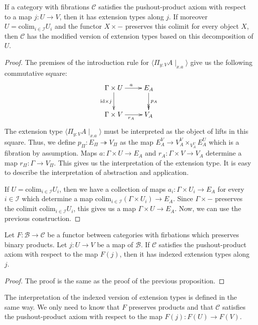 \documentclass[reqno]{amsart}
\theoremstyle{definition}
\theoremstyle{remark}
\newcommand{\fs}[1]{\mathrm{#1}}
\newcommand{\scat}[1]{\mathcal{#1}}
\newcommand{\id}{\fs{id}}
\numberwithin{figure}{section}
\begin{document}
\begin{prop}
If a category with fibrations $\scat{C}$ satisfies the pushout-product axiom with respect to a map $j : U \to V$, then it has extension types along $j$.
If moreover $U = \fs{colim}_{i \in \scat{I}} U_i$ and the functor $X \times -$ preserves this colimit for every object $X$, then $\scat{C}$ has the modified version of extension types based on this decomposition of $U$.
\end{prop}
\begin{proof}
The premises of the introduction rule for $\langle \Pi_{y : V} A \mid_{x.a} \rangle$ give us the following commutative square:
\[ \xymatrix{ \Gamma \times U \ar[r]^a \ar[d]_{\id \times j}    & E_A \ar@{->>}[d]^{p_A} \\
              \Gamma \times V \ar[r]_{r_A}                      & V_A
            } \]
The extension type $\langle \Pi_{y : V} A \mid_{x.a} \rangle$ must be interpreted as the object of lifts in this square.
Thus, we define $p_\Pi : E_\Pi \twoheadrightarrow V_\Pi$ as the map $E_A^V \to V_A^V \times_{V_A^U} E_A^U$ which is a fibration by assumption.
Maps $a : \Gamma \times U \to E_A$ and $r_A : \Gamma \times V \to V_A$ determine a map $r_\Pi : \Gamma \to V_\Pi$.
This gives us the interpretation of the extension type.
It is easy to describe the interpretation of abstraction and application.

If $U = \fs{colim}_{i \in \scat{I}} U_i$, then we have a collection of maps $a_i : \Gamma \times U_i \to E_A$ for every $i \in \mathcal{I}$
which determine a map $\fs{colim}_{i \in \mathcal{I}}(\Gamma \times U_i) \to E_A$.
Since $\Gamma \times -$ preserves the colimit $\fs{colim}_{i \in \mathcal{I}} U_i$, this gives us a map $\Gamma \times U \to E_A$.
Now, we can use the previous construction.
\end{proof}

\begin{prop}
Let $F : \scat{B} \to \scat{C}$ be a functor between categories with firbations which preserves binary products.
Let $j : U \to V$ be a map of $\scat{B}$.
If $\scat{C}$ satisfies the pushout-product axiom with respect to the map $F(j)$, then it has indexed extension types along $j$.
\end{prop}
\begin{proof}
The proof is the same as the proof of the previous proposition.
\end{proof}

\begin{remark}
The interpretation of the indexed version of extension types is defined in the same way.
We only need to know that $F$ preserves products and that $\scat{C}$ satisfies the pushout-product axiom with respect to the map $F(j) : F(U) \to F(V)$.
\end{remark}
\end{document}
